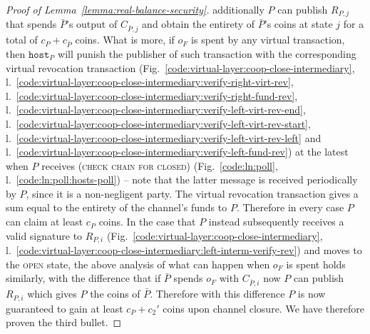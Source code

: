 \begin{proof}[Proof of Lemma~\ref{lemma:real-balance-security}]
  additionally $P$ can publish $R_{P, j}$ that spends $\bar{P}$'s output of
  $C_{\bar{P}, j}$ and obtain the entirety of $\bar{P}$'s coins at state $j$ for
  a total of $c_P + c_{\bar{P}}$ coins. What is more, if $o_F$ is spent by any
  virtual transaction, then $\texttt{host}_P$ will punish the publisher of such
  transaction with the corresponding virtual revocation transaction
  (Fig.~\ref{code:virtual-layer:coop-close-intermediary},
  l.~\ref{code:virtual-layer:coop-close-intermediary:verify-right-virt-rev},
  l.~\ref{code:virtual-layer:coop-close-intermediary:verify-right-fund-rev},
  l.~\ref{code:virtual-layer:coop-close-intermediary:verify-left-virt-rev-end},
  l.~\ref{code:virtual-layer:coop-close-intermediary:verify-left-virt-rev-start},
  l.~\ref{code:virtual-layer:coop-close-intermediary:verify-left-virt-rev-left}
  and l.~\ref{code:virtual-layer:coop-close-intermediary:verify-left-fund-rev})
  at the latest when $P$ receives (\textsc{check chain for closed})
  (Fig.~\ref{code:ln:poll}, l.~\ref{code:ln:poll:hosts-poll}) -- note that the
  latter message is received periodically by $P$, since it is a non-negligent
  party. The virtual revocation transaction gives a sum equal to the entirety of
  the channel's funds to $P$. Therefore in every case $P$ can claim at least
  $c_P$ coins. In the case that $P$ instead
  subsequently receives a valid signature to $R_{P, i}$
  (Fig.~\ref{code:virtual-layer:coop-close-intermediary},
  l.~\ref{code:virtual-layer:coop-close-intermediary:left-interm-verify-rev})
  and moves to the \textsc{open} state, the above analysis of what can happen
  when $o_F$ is spent holds similarly, with the difference that if $\bar{P}$
  spends $o_F$ with $C_{\bar{P}, i}$ now $P$ can publish $R_{P, i}$ which gives
  $P$ the coins of $\bar{P}$. Therefore with this difference $P$ is now
  guaranteed to gain at least $c_P + c_2'$ coins upon channel closure. We have
  therefore proven the third bullet.


\end{proof}
